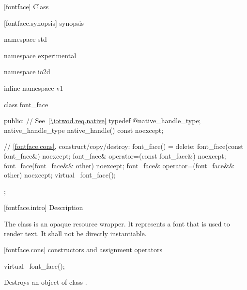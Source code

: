  [fontface] {Class }

 [fontface.synopsis] { synopsis}

\begin{codeblock}
namespace std { namespace experimental { namespace io2d { inline namespace v1 {
  class font_face {
  public:
    // See~\ref{\iotwod.req.native}
    typedef @\impdef@ native_handle_type;
    native_handle_type native_handle() const noexcept;

    // \ref{fontface.cons}, construct/copy/destroy:
    font_face() = delete;
    font_face(const font_face&) noexcept;
    font_face& operator=(const font_face&) noexcept;
    font_face(font_face&& other) noexcept;
    font_face& operator=(font_face&& other) noexcept;
    virtual ~font_face();
  };
} } } }
\end{codeblock}

 [fontface.intro] { Description}

\pnum
{}
The  class is an opaque resource wrapper. It represents a 
font that is used to render text. It shall not be directly instantiable.

 [fontface.cons] { constructors and 
assignment operators}

\begin{itemdecl}
virtual ~font_face();
\end{itemdecl}
\begin{itemdescr}
	\pnum
	\effects
	Destroys an object of class .
	
\end{itemdescr}
